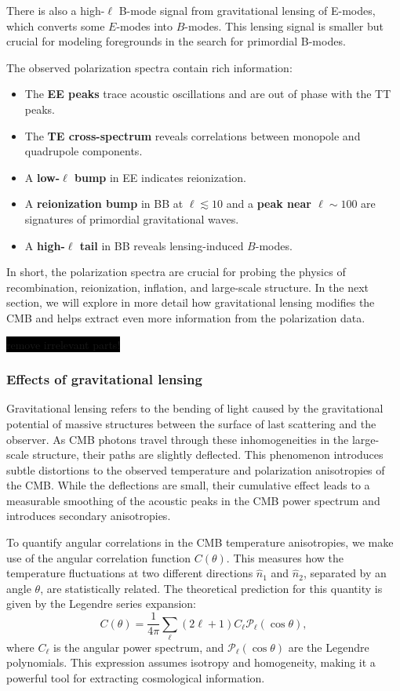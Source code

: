 \documentclass{aa}
\numberwithin{equation}{section}
\numberwithin{table}{section}
\numberwithin{figure}{section}
\begin{document}
There is also a high-$\ell$ B-mode signal from gravitational lensing of E-modes, which converts some $E$-modes into $B$-modes. This lensing signal is smaller but crucial for modeling foregrounds in the search for primordial B-modes.

The observed polarization spectra contain rich information:
\begin{itemize}
  \item The \textbf{EE peaks} trace acoustic oscillations and are out of phase with the TT peaks.
  \item The \textbf{TE cross-spectrum} reveals correlations between monopole and quadrupole components.
  \item A \textbf{low-$\ell$ bump} in EE indicates reionization.
  \item A \textbf{reionization bump} in BB at $\ell \lesssim 10$ and a \textbf{peak near $\ell \sim 100$} are signatures of primordial gravitational waves.
  \item A \textbf{high-$\ell$ tail} in BB reveals lensing-induced $B$-modes.
\end{itemize}

In short, the polarization spectra are crucial for probing the physics of recombination, reionization, inflation, and large-scale structure. In the next section, we will explore in more detail how gravitational lensing modifies the CMB and helps extract even more information from the polarization data.

\colorbox{black}{remove irrelevant parts!}
\color{black}



\subsubsection{Effects of gravitational lensing}
\color{Plum}
Gravitational lensing refers to the bending of light caused by the gravitational potential of massive structures between the surface of last scattering and the observer. As CMB photons travel through these inhomogeneities in the large-scale structure, their paths are slightly deflected. This phenomenon introduces subtle distortions to the observed temperature and polarization anisotropies of the CMB. While the deflections are small, their cumulative effect leads to a measurable smoothing of the acoustic peaks in the CMB power spectrum and introduces secondary anisotropies.

To quantify angular correlations in the CMB temperature anisotropies, we make use of the angular correlation function $C(\theta)$. This measures how the temperature fluctuations at two different directions $\hat{n}_1$ and $\hat{n}_2$, separated by an angle $\theta$, are statistically related. The theoretical prediction for this quantity is given by the Legendre series expansion:
\begin{equation}
C(\theta) = \frac{1}{4\pi} \sum_\ell (2\ell + 1) C_\ell \mathcal{P}_\ell(\cos\theta),
\end{equation}
where $C_\ell$ is the angular power spectrum, and $\mathcal{P}_\ell(\cos\theta)$ are the Legendre polynomials. This expression assumes isotropy and homogeneity, making it a powerful tool for extracting cosmological information.
\end{document}
